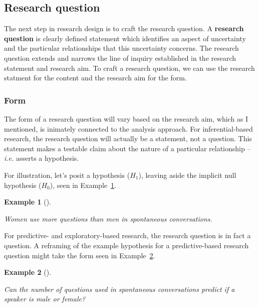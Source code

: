 \documentclass[
  letterpaper,
]{latex/krantz}
\theoremstyle{definition}
\newtheorem{example}{Example}[chapter]
\theoremstyle{remark}
\begin{document}
\subsection{Research question}\label{sec-research-question}

The next step in research design is to craft the research question. A
\textbf{research question} is clearly defined
statement which identifies an aspect of uncertainty and the particular
relationships that this uncertainty concerns. The research question
extends and narrows the line of inquiry established in the research
statement and research aim. To craft a research question, we can use the
research statment for the content and the research aim for the form.

\subsubsection{Form}\label{sec-research-question-form}

The form of a research question will vary based on the research aim,
which as I mentioned, is inimately connected to the analysis approach.
For inferential-based research, the research question will actually be a
statement, not a question. This statement makes a testable claim about
the nature of a particular relationship --\emph{i.e.} asserts a
hypothesis.

For illustration, let's posit a hypothesis (\(H_1\)), leaving aside the
implicit null hypothesis (\(H_0\)), seen in
Example~\ref{exm-research-form-infer}.

\begin{example}[]\protect\hypertarget{exm-research-form-infer}{}\label{exm-research-form-infer}

\emph{Women use more questions than men in spontaneous conversations.}

\end{example}

For predictive- and exploratory-based research, the research question is
in fact a question. A reframing of the example hypothesis for a
predictive-based research question might take the form seen in
Example~\ref{exm-research-form-pred}.

\begin{example}[]\protect\hypertarget{exm-research-form-pred}{}\label{exm-research-form-pred}

\emph{Can the number of questions used in spontaneous conversations
predict if a speaker is male or female?}

\end{example}
\end{document}

